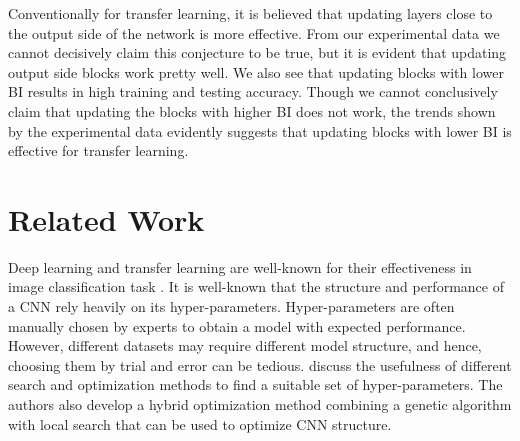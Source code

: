 \documentclass[a4paper,fleqn]{cas-sc}
\begin{document}
Conventionally for transfer learning, it is believed that updating layers close to the output side of the network is more effective. From our experimental data we cannot decisively claim this conjecture to be true, but it is evident that updating output side blocks work pretty well. We also see that updating blocks with lower BI results in high training and testing accuracy. Though we cannot conclusively claim that updating the blocks with higher BI does not work, the trends shown by the experimental data evidently suggests that updating blocks with lower BI is effective for transfer learning.

\section{Related Work}
\label{sec:related work}



Deep learning and transfer learning are well-known for their effectiveness in image classification task \cite{strawberry}. It is well-known that the structure and performance of a CNN rely heavily on its hyper-parameters. Hyper-parameters are often manually chosen by experts to obtain a model with expected performance. However, different datasets may require different model structure, and hence, choosing them by trial and error can be tedious. \citet{AszemiDomic2019} discuss the usefulness of different search and optimization methods to find a suitable set of hyper-parameters. The authors also develop a hybrid optimization method combining a genetic algorithm with local search that can be used to optimize CNN structure. %
\end{document}
